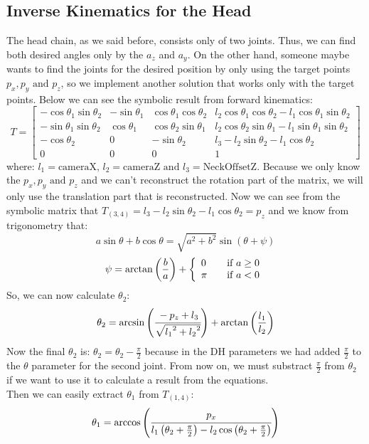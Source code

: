 \subsection{Inverse Kinematics for the Head}
The head chain, as we said before, consists only of two joints. Thus, we can find both desired angles only by the $a_z$ and $a_y$. On the other hand, someone maybe wants to find the joints for the desired position by only using the target points $p_x,p_y\text{ and }p_z$, so we implement another solution that works only with the target points. Below we can see the symbolic result from forward kinematics:
\[
T = 
\begin{bmatrix}
-\cos\theta_1\sin\theta_2 & -\sin\theta_1 & \cos\theta_1\cos\theta_2 &  l_2\cos\theta_1\cos\theta_2 - l_1\cos\theta_1\sin\theta_2\\
-\sin\theta_1\sin\theta_2 & \cos\theta_1 & \cos\theta_2\sin\theta_1 & l_2\cos\theta_2\sin\theta_1 - l_1\sin\theta_1\sin\theta_2\\
-\cos\theta_2 & 0 & -\sin\theta_2 & l_3 - l_2\sin\theta_2 - l_1\cos\theta_2\\
0 & 0 & 0 & 1
\end{bmatrix}
\]
where: $l_1 = \text{cameraX, }l_2 = \text{cameraZ and }l_3 = \text{NeckOffsetZ}$.
Because we only know the $p_x,p_y\text{ and }p_z$ and we can't reconstruct the rotation part of the matrix, we will only use the translation part that is reconstructed. Now we can see from the symbolic matrix that $T_{(3,4)} = l_3 - l_2\sin\theta_2 - l_1\cos\theta_2 = p_z$ and we know from trigonometry that: 
\[
a\sin\theta + b\cos\theta = \sqrt{a^2+b^2}\sin\left(\theta + \psi\right)
\]
\[
\psi=\arctan\left(\frac{b}{a}\right) + \left\{ 
  \begin{array}{l l}
    0 & \quad \text{if }a\geq0\\
    \pi & \quad \text{if }a<0\\
  \end{array} \right.
\]
So, we can now calculate $\theta_2$:
\[
\theta_2 = \arcsin\left(\cfrac{-p_z+l_3}{\sqrt{{l_1}^2+{l_2}^2}}\right) + \arctan\left(\frac{l_1}{l_2}\right)
\]
Now the final $\theta_2$ is: $\theta_2 = \theta_2 - \frac{\pi}{2}$ because in the DH parameters we had added $\frac{\pi}{2}$ to the $\theta$ parameter for the second joint.  From now on, we must substract $\frac{\pi}{2}$ from $\theta_2$ if we want to use it to calculate a result from the equations.\\
Then we can easily extract $\theta_1$ from $T_{(1,4)}$:
\[
\theta_1 = \arccos\left(\cfrac{p_x}{l_1\left(\theta_2 + \frac{\pi}{2}\right) - l_2\cos\left(\theta_2 + \frac{\pi}{2}\right)}\right)
\]

